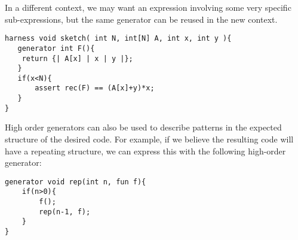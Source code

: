 In a different context, we may want an expression involving some very specific sub-expressions, but the same generator can be reused in the new context.
\begin{lstlisting}
harness void sketch( int N, int[N] A, int x, int y ){   
   generator int F(){
	return {| A[x] | x | y |};
   }
   if(x<N){
	   assert rec(F) == (A[x]+y)*x;
   }
}
\end{lstlisting}

High order generators can also be used to describe patterns in the expected structure of the desired code. For example, if we believe the resulting code will have a repeating structure, we can express this with the following high-order generator: 

\begin{lstlisting}
generator void rep(int n, fun f){
    if(n>0){
        f();
        rep(n-1, f);
    }    
}
\end{lstlisting}

